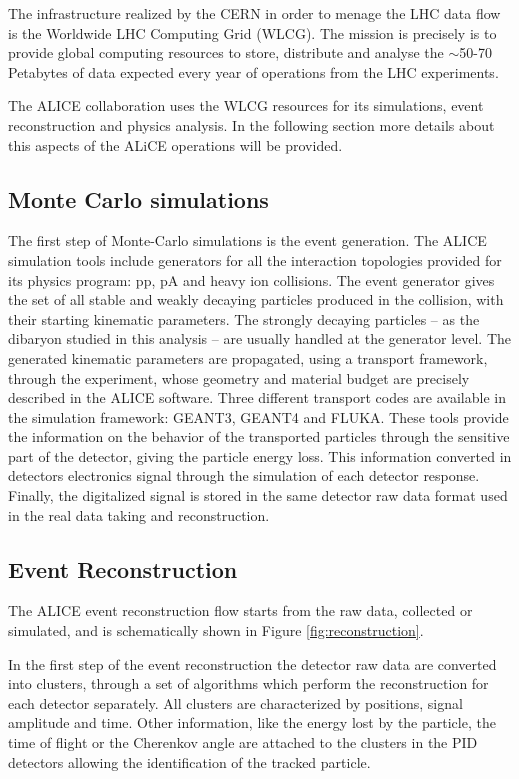 The infrastructure realized by the CERN in order to menage the LHC data flow is the Worldwide 
LHC Computing Grid (WLCG). The mission is precisely is to provide global 
computing resources to store, distribute and analyse the $\sim$50-70 Petabytes of data expected every
year of operations from the LHC experiments.

The ALICE collaboration uses the WLCG resources for its simulations, event reconstruction and physics
analysis. In the following section more details about this aspects of the ALiCE operations will be 
provided.

%
\subsection{Monte Carlo simulations} \label{sec:montecarlo}

The first step of Monte-Carlo simulations is the event generation. 
The ALICE simulation tools include generators for all the interaction topologies provided for its
physics program: pp, pA and heavy ion collisions.
The event generator gives the set of all stable and weakly decaying particles produced in the collision,
with their starting kinematic parameters. The strongly decaying particles -- as the \dst dibaryon studied
in this analysis -- are usually handled at the generator level.
The generated kinematic parameters are propagated, using a transport framework, through the experiment,
whose geometry and material budget are precisely described in the ALICE software.
Three different transport codes are available in the simulation framework: GEANT3, GEANT4 and FLUKA.
These tools provide the information on the behavior of the transported particles through the sensitive
part of the detector, giving the particle energy loss. 
This information converted in detectors electronics signal through the simulation of each detector
response. Finally, the digitalized signal is stored in the same detector raw data format used in the 
real data taking and reconstruction.

%
\subsection{Event Reconstruction} \label{sec:event_rec}

The ALICE event reconstruction flow starts from the raw data, collected or simulated, and is 
schematically shown in Figure \ref{fig:reconstruction}. 

In the first step of the event reconstruction the detector raw data are converted into clusters, 
through a set of algorithms which perform the reconstruction for each detector separately.
All clusters are characterized by positions, signal amplitude and time.
Other information, like the energy lost by the particle, the time of flight or the Cherenkov 
angle are attached to the clusters in the PID detectors allowing the identification of the 
tracked particle.

